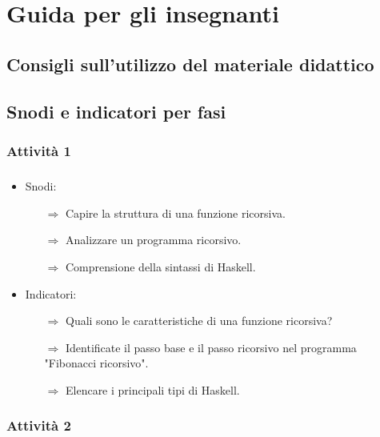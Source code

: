 \chapter{Guida per gli insegnanti}

\section{Consigli sull'utilizzo del materiale didattico}

\section{Snodi e indicatori per fasi}

\subsection{Attività 1}

\paragraph{}

\begin{itemize}
    \item Snodi:
    \begin{itemize}
        \item [$\Rightarrow$] Capire la struttura di una funzione ricorsiva.
        \item [$\Rightarrow$] Analizzare un programma ricorsivo.
        \item [$\Rightarrow$] Comprensione della sintassi di Haskell.
    \end{itemize}
    \item Indicatori:
    \begin{itemize}
        \item [$\Rightarrow$] Quali sono le caratteristiche di una funzione ricorsiva?
        \item [$\Rightarrow$] Identificate il passo base e il passo ricorsivo nel programma
                              "Fibonacci ricorsivo".
        \item [$\Rightarrow$] Elencare i principali tipi di Haskell.
    \end{itemize}
\end{itemize}

\subsection{Attività 2}

